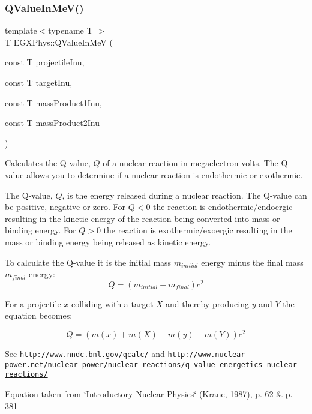 \subsubsection{\texorpdfstring{Q\+Value\+In\+Me\+V()}{QValueInMeV()}}
{\footnotesize\ttfamily template$<$typename T $>$ \\
T E\+G\+X\+Phys\+::\+Q\+Value\+In\+MeV (\begin{DoxyParamCaption}\item[{const T}]{projectile\+Inu,  }\item[{const T}]{target\+Inu,  }\item[{const T}]{mass\+Product1\+Inu,  }\item[{const T}]{mass\+Product2\+Inu }\end{DoxyParamCaption})}



Calculates the Q-\/value, $Q$ of a nuclear reaction in megaelectron volts. The Q-\/value allows you to determine if a nuclear reaction is endothermic or exothermic. 

The Q-\/value, $Q$, is the energy released during a nuclear reaction. The Q-\/value can be positive, negative or zero. For $Q < 0$ the reaction is endothermic/endoergic resulting in the kinetic energy of the reaction being converted into mass or binding energy. For $Q > 0$ the reaction is exothermic/exoergic resulting in the mass or binding energy being released as kinetic energy.

To calculate the Q-\/value it is the initial mass $m_{initial}$ energy minus the final mass $m_{final}$ energy\+: \[Q = \left ( m_{initial}-m_{final}\right ) c^2\]

For a projectile $x$ colliding with a target $X$ and thereby producing $y$ and $Y$ the equation becomes\+:

\[Q = \left ( m(x) + m (X) - m(y) - m(Y) \right ) c^2\]

See \href{http://www.nndc.bnl.gov/qcalc/}{\tt http\+://www.\+nndc.\+bnl.\+gov/qcalc/} and \href{http://www.nuclear-power.net/nuclear-power/nuclear-reactions/q-value-energetics-nuclear-reactions/}{\tt http\+://www.\+nuclear-\/power.\+net/nuclear-\/power/nuclear-\/reactions/q-\/value-\/energetics-\/nuclear-\/reactions/}

Equation taken from \char`\"{}\+Introductory Nuclear Physics\char`\"{} (Krane, 1987), p. 62 \& p. 381


